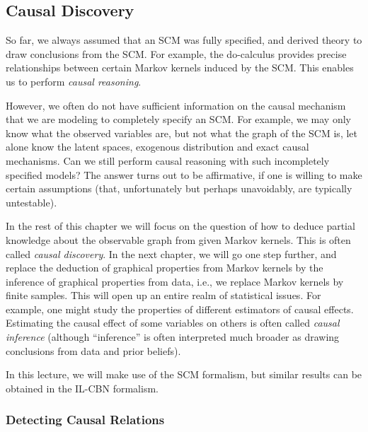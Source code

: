 \subsection{Causal Discovery}

So far, we always assumed that an SCM was fully specified, and derived theory to 
draw conclusions from the SCM. For example, the do-calculus provides precise
relationships between certain Markov kernels induced by the SCM.
This enables us to perform \emph{causal reasoning}.

However, we often do not have sufficient information on the causal mechanism that
we are modeling to completely specify an SCM. For example, we may only know what
the observed variables are, but not what the graph of the SCM is, let alone know the
latent spaces, exogenous distribution and exact causal mechanisms. Can we still
perform causal reasoning with such incompletely specified models? The answer turns
out to be affirmative, if one is willing to make certain assumptions (that,
unfortunately but perhaps unavoidably, are typically untestable).

In the rest of this chapter we will focus on the question of how to deduce partial knowledge about
the observable graph from given Markov kernels. This is often called \emph{causal 
discovery}. In the next chapter, we will go one step further, and replace the deduction
of graphical properties from Markov kernels by the inference of graphical properties
from data, i.e., we replace Markov kernels by finite samples. This will open up an
entire realm of statistical issues. For example, one might study the properties of 
different estimators of causal effects. Estimating the causal effect of some variables
on others is often called \emph{causal inference} (although ``inference'' is often
interpreted much broader as drawing conclusions from data and prior beliefs).

In this lecture, we will make use of the SCM formalism, but similar results can be obtained in the IL-CBN formalism.

\subsubsection{Detecting Causal Relations}

